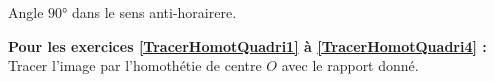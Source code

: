 \hfill
\begin{minipage}[t]{0.45\textwidth}
    
    Angle $90$° dans le sens anti-horairere.
    
    \begin{figure}[H]
        \centering
    \end{figure}
\end{minipage}

\textbf{Pour les exercices \ref{TracerHomotQuadri1} à \ref{TracerHomotQuadri4} : }Tracer l'image par l'homothétie de centre $O$ avec le rapport donné.
\vspace{-2em}

